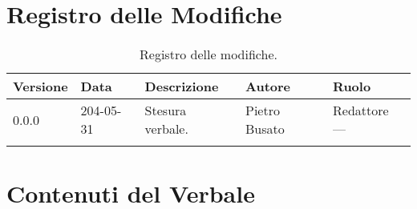 \documentclass[8pt]{article}
\begin{document}
\section*{Registro delle Modifiche}
\begin{table}[ht!]	
	\centering
	\begin{tabular}{p{1.2cm} p{2cm} p{6cm} p{3cm} p{2cm}}
		\toprule
		\textbf{Versione}& \textbf{Data} & \textbf{Descrizione} & \textbf{Autore} & \textbf{Ruolo} \\
		\midrule
		0.0.0 & 204-05-31 & Stesura verbale.  & Pietro Busato & Redattore
		--- \\\\ %
		\bottomrule
	\end{tabular}
	\caption{Registro delle modifiche.}
	\label{table:Registro delle modifiche}
\end{table}
\newpage
\tableofcontents
\clearpage
\newpage
\justifying
\section{Contenuti del Verbale}
\end{document}
